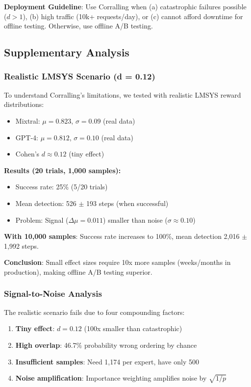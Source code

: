 \textbf{Deployment Guideline}: Use Corralling when (a) catastrophic failures possible ($d > 1$), (b) high traffic (10k+ requests/day), or (c) cannot afford downtime for offline testing. Otherwise, use offline A/B testing.

\subsection{Supplementary Analysis}

\subsubsection{Realistic LMSYS Scenario (d = 0.12)}

To understand Corralling's limitations, we tested with realistic LMSYS reward distributions:
\begin{itemize}
    \item Mixtral: $\mu=0.823$, $\sigma=0.09$ (real data)
    \item GPT-4: $\mu=0.812$, $\sigma=0.10$ (real data)
    \item Cohen's $d \approx 0.12$ (tiny effect)
\end{itemize}

\textbf{Results (20 trials, 1,000 samples):}
\begin{itemize}
    \item Success rate: 25\% (5/20 trials)
    \item Mean detection: 526 $\pm$ 193 steps (when successful)
    \item Problem: Signal ($\Delta \mu = 0.011$) smaller than noise ($\sigma \approx 0.10$)
\end{itemize}

\textbf{With 10,000 samples}: Success rate increases to 100\%, mean detection 2,016 $\pm$ 1,992 steps.

\textbf{Conclusion}: Small effect sizes require 10x more samples (weeks/months in production), making offline A/B testing superior.

\subsubsection{Signal-to-Noise Analysis}

The realistic scenario fails due to four compounding factors:
\begin{enumerate}
    \item \textbf{Tiny effect}: $d = 0.12$ (100x smaller than catastrophic)
    \item \textbf{High overlap}: 46.7\% probability wrong ordering by chance
    \item \textbf{Insufficient samples}: Need 1,174 per expert, have only 500
    \item \textbf{Noise amplification}: Importance weighting amplifies noise by $\sqrt{1/p}$
\end{enumerate}

